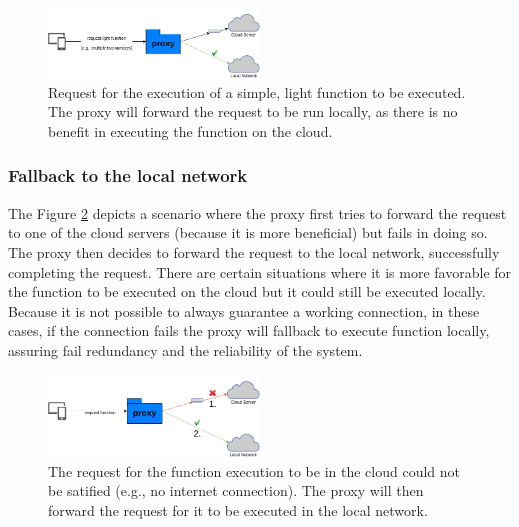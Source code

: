 \documentclass[conference]{IEEEtran}
\begin{document}
\begin{figure}[ht]
  \begin{center}
    \includegraphics[width=0.5\textwidth]{diss-succ-local-deploy.png}
    \caption{Request for the execution of a simple, light function to be executed. The
    proxy will forward the request to be run locally, as there is no benefit in
    executing the function on the cloud.}
    \label{fig:succ-local-deploy}
  \end{center}
\end{figure}

\subsubsection{Fallback to the local network}
\label{usecases:fallback}

The Figure \ref{fig:fallback-local} depicts a scenario where the proxy first tries
to forward the request to one of the cloud servers (because it is more beneficial)
but fails in doing so. The proxy then decides to forward the request to the local
network, successfully completing the request. There are certain situations where
it is more favorable for the function to be executed on the cloud but it could
still be executed locally. Because it is not possible to always guarantee a
working connection, in these cases, if the connection fails the proxy will
fallback to execute function locally, assuring fail redundancy and the reliability
of the system.

\begin{figure}[ht]
  \begin{center}
    \includegraphics[width=0.5\textwidth]{diss-fallback-local.png}
    \caption{The request for the function execution to be in the cloud could not
    be satified (e.g., no internet connection). The proxy will then forward the
request for it to be executed in the local network.}
    \label{fig:fallback-local}
  \end{center}
\end{figure}
\end{document}
